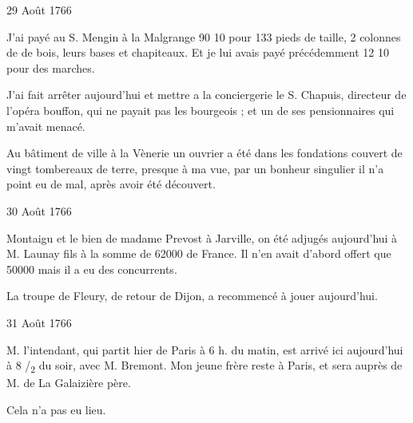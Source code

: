                      \begin{diary}{29 Août 1766}{}

                         J'ai payé au S. Mengin à la
                              Malgrange
                           90 10 pour 133 pieds de taille, 2 colonnes de de bois, leurs bases et chapiteaux. Et je lui avais
                           payé précédemment 12 10
                           pour des marches. \bigskip


                         J'ai fait arrêter aujourd'hui et
                           mettre a la
                              conciergerie
                           le S. Chapuis, directeur de
                           l'opéra
                           bouffon, qui ne payait pas les bourgeois ; et
                           un de ses pensionnaires qui m'avait menacé. \bigskip


                         Au bâtiment de ville à la Vènerie un ouvrier a été dans
                           les fondations couvert de vingt tombereaux de
                           terre, presque à ma vue, par un bonheur
                           singulier il n'a point eu de mal, après avoir
                           été découvert. \bigskip


                     \end{diary}

                     \begin{diary}{30 Août 1766}{}


                           Montaigu et le bien de madame Prevost à
                           Jarville, on été adjugés aujourd'hui à M.
                              Launay fils à la somme de 62000 de
                              France. Il n'en avait d'abord offert que
                           50000 mais il a eu des concurrents. \bigskip


                         La troupe de Fleury, de retour de Dijon,
                           a recommencé à jouer aujourd'hui. \bigskip


                     \end{diary}

                     \begin{diary}{31 Août 1766}{}


                           M. l'intendant, qui partit hier
                           de Paris
                           à 6 h. du matin, est arrivé ici aujourd'hui
                           à 8 /\textsubscript{2} du soir, avec
                              M. Bremont. Mon
                              jeune frère reste à Paris, et sera
                           auprès de M. de La Galaizière père. \bigskip



                           Cela n'a pas eu lieu.
                        \bigskip


                     \end{diary}
